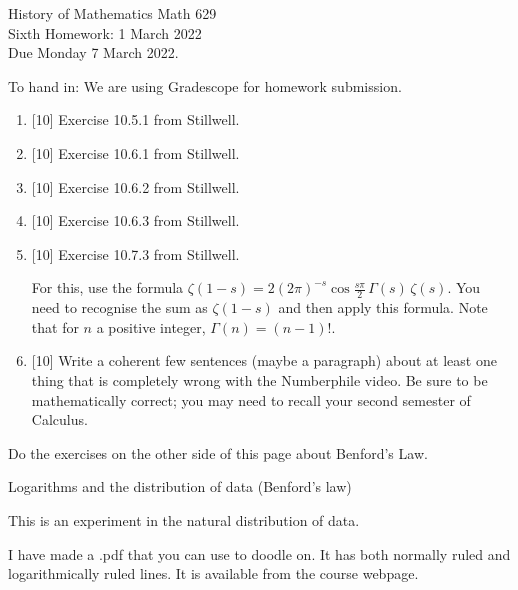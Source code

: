 \documentclass[12pt]{article}
\begin{document}
\LARGE 
\noindent
{\color{Maroon}History of Mathematics \hfill Math 629}\vspace{2pt}\\
\large
Sixth Homework: \hfill 1 March 2022\\
Due Monday 7 March 2022.
\normalsize\vspace{10pt}

To hand in: We are using Gradescope for homework submission.


\begin{enumerate}

\item  {[10]}
     Exercise 10.5.1 from Stillwell.

\item  {[10]}
     Exercise 10.6.1 from Stillwell.


\item  {[10]}
     Exercise 10.6.2 from Stillwell. 

\item  {[10]}
     Exercise 10.6.3 from Stillwell. 

 
\item  {[10]}
  Exercise 10.7.3 from Stillwell.

  For this, use the formula $\zeta(1-s) = 2 (2\pi)^{-s} \cos\frac{s\pi}{2}\,\Gamma(s)\, \zeta(s)$.
  You need to recognise the sum as $\zeta(1-s)$ and then apply this formula.  Note that for $n$ a positive integer, $\Gamma(n)=(n-1)!$.

 
\item  {[10]}
  Write a coherent few sentences (maybe a paragraph) about at least one thing that is completely wrong with the Numberphile video.
  Be sure to be mathematically correct; you may need to recall your second semester of Calculus.



\end{enumerate}

{\Large\sf\color{Maroon}Do the exercises on the other side of this page about Benford's Law.}


\newpage

{\Large Logarithms and the distribution of data (Benford's law)}


This is an experiment in the natural distribution of data.

I have made a .pdf that you can use to doodle on. It has both normally ruled and logarithmically ruled lines.
It is available from the course webpage.
\end{document}
